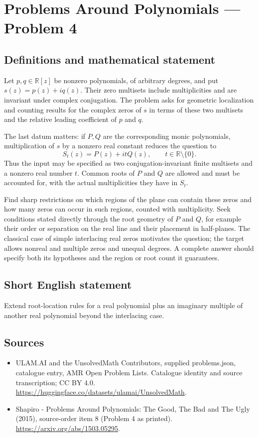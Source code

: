 \documentclass[11pt,a4paper]{article}
\begin{document}
\section*{Problems Around Polynomials — Problem 4}\label{statement}

\subsection{Definitions and mathematical statement}
Let $p,q\in\mathbb R[z]$ be nonzero polynomials, of arbitrary degrees,
and put $s(z)=p(z)+iq(z)$. Their zero multisets include multiplicities
and are invariant under complex conjugation. The problem asks for
geometric localization and counting results for the complex zeros of
$s$ in terms of these two multisets and the relative leading
coefficient of $p$ and $q$.

The last datum matters: if $P,Q$ are the corresponding monic
polynomials, multiplication of $s$ by a nonzero real constant reduces
the question to
\[
 S_t(z)=P(z)+itQ(z),\qquad t\in\mathbb R\setminus\{0\}.
\]
Thus the input may be specified as two conjugation-invariant finite
multisets and a nonzero real number $t$. Common roots of $P$ and $Q$
are allowed and must be accounted for, with the actual multiplicities
they have in $S_t$.

Find sharp restrictions on which regions of the plane can contain
these zeros and how many zeros can occur in such regions, counted
with multiplicity. Seek conditions stated directly through the root
geometry of $P$ and $Q$, for example their order or separation on the
real line and their placement in half-planes. The classical case of
simple interlacing real zeros motivates the question; the target
allows nonreal and multiple zeros and unequal degrees. A complete
answer should specify both its hypotheses and the region or root
count it guarantees.
\subsection{Short English statement}
Extend root-location rules for a real polynomial plus an imaginary multiple of another real polynomial beyond the interlacing case.
\subsection{Sources}
\begin{itemize}
\item[S1] ULAM.AI and the UnsolvedMath Contributors, supplied problems.json, catalogue entry, AMR Open Problem Lists. Catalogue identity and source transcription; CC BY 4.0.
\url{https://huggingface.co/datasets/ulamai/UnsolvedMath}.
\item[S2] Shapiro - Problems Around Polynomials: The Good, The Bad and The Ugly (2015), source-order item 8 (Problem 4 as printed). 
\url{https://arxiv.org/abs/1503.05295}.
\end{itemize}
\end{document}
